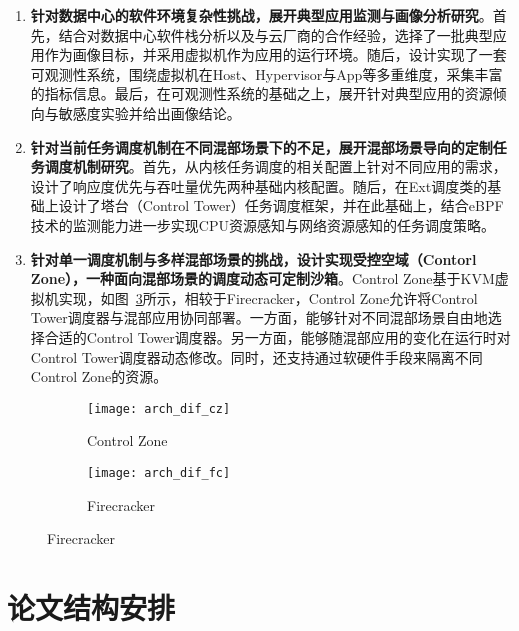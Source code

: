 \begin{enumerate}

    \item \textbf{针对数据中心的软件环境复杂性挑战，展开典型应用监测与画像分析研究}。首先，结合对数据中心软件栈分析以及与云厂商的合作经验，选择了一批典型应用作为画像目标，并采用虚拟机作为应用的运行环境。随后，设计实现了一套可观测性系统，围绕虚拟机在Host、Hypervisor与App等多重维度，采集丰富的指标信息。最后，在可观测性系统的基础之上，展开针对典型应用的资源倾向与敏感度实验并给出画像结论。

    \item \textbf{针对当前任务调度机制在不同混部场景下的不足，展开混部场景导向的定制任务调度机制研究}。首先，从内核任务调度的相关配置上针对不同应用的需求，设计了响应度优先与吞吐量优先两种基础内核配置。随后，在Ext调度类的基础上设计了塔台（Control Tower）任务调度框架，并在此基础上，结合eBPF技术的监测能力进一步实现CPU资源感知与网络资源感知的任务调度策略。

    \item \textbf{针对单一调度机制与多样混部场景的挑战，设计实现受控空域（Contorl Zone），一种面向混部场景的调度动态可定制沙箱}。Control Zone基于KVM虚拟机实现，如图~\ref{fig:arch_dif}所示，相较于Firecracker\citep{agache2020firecracker}，Control Zone允许将Control Tower调度器与混部应用协同部署。一方面，能够针对不同混部场景自由地选择合适的Control Tower调度器。另一方面，能够随混部应用的变化在运行时对Control Tower调度器动态修改。同时，还支持通过软硬件手段来隔离不同Control Zone的资源。

\end{enumerate}

\begin{figure}[!htbp]
    \centering
    \begin{subfigure}[b]{0.45\textwidth}
        \texttt{[image: arch\_dif\_cz]}
        \caption{Control Zone}
        \label{fig:arch_dif_cz}
    \end{subfigure}
    \hfill
    \begin{subfigure}[b]{0.45\textwidth}
        \texttt{[image: arch\_dif\_fc]}
        \caption{Firecracker}
        \label{fig:arch_dif_fc}
    \end{subfigure}
\label{fig:arch_dif}
\end{figure}

\section{论文结构安排}

